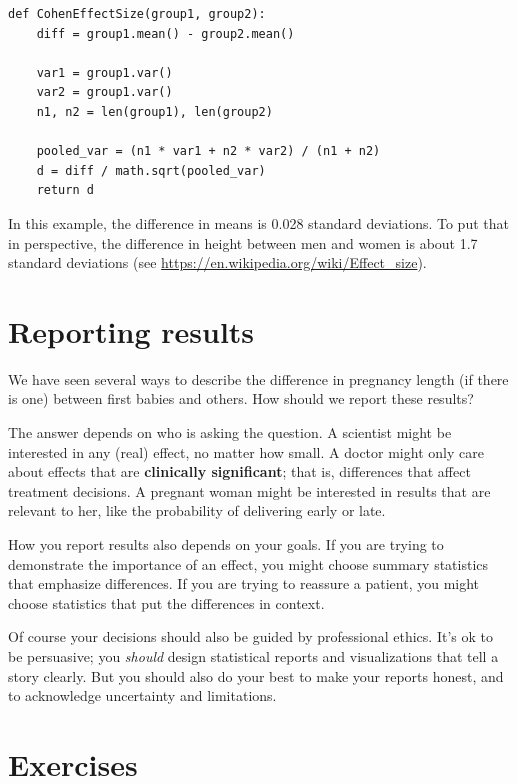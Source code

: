 \documentclass[12pt]{book}
\begin{document}
\begin{verbatim}
def CohenEffectSize(group1, group2):
    diff = group1.mean() - group2.mean()

    var1 = group1.var()
    var2 = group1.var()
    n1, n2 = len(group1), len(group2)

    pooled_var = (n1 * var1 + n2 * var2) / (n1 + n2)
    d = diff / math.sqrt(pooled_var)
    return d
\end{verbatim}

In this example, the difference in means is 0.028 standard deviations.
To put that in perspective, the difference in height between men and
women is about 1.7 standard deviations (see
\url{https://en.wikipedia.org/wiki/Effect_size}).


\section{Reporting results}

We have seen several ways to describe the difference in pregnancy
length (if there is one) between first babies and others.  How should
we report these results?

The answer depends on who is asking the question.  A scientist might
be interested in any (real) effect, no matter how small.  A doctor
might only care about effects that are {\bf clinically significant};
that is, differences that affect treatment decisions.  A pregnant
woman might be interested in results that are relevant to her, like
the probability of delivering early or late.   

How you report results also depends on your goals.  If you are trying
to demonstrate the importance of an effect, you might choose summary
statistics that emphasize differences.  If you are trying to reassure
a patient, you might choose statistics that put the differences in
context.

Of course your decisions should also be guided by professional ethics.
It's ok to be persuasive; you {\em should} design statistical reports
and visualizations that tell a story clearly.  But you should also do
your best to make your reports honest, and to acknowledge uncertainty
and limitations.


\section{Exercises}
\end{document}
